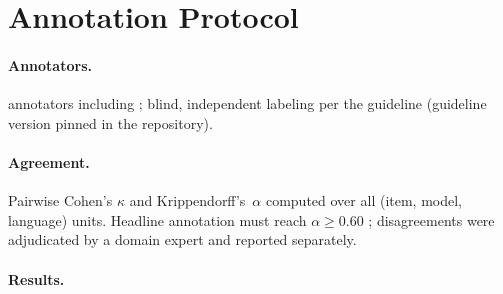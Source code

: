 \section{Annotation Protocol}
\label{sec:annotation}

\paragraph{Annotators.}  annotators including ; blind, independent labeling per the guideline
(guideline version pinned in the repository).

\paragraph{Agreement.} Pairwise Cohen's $\kappa$ and Krippendorff's~$\alpha$
computed over all (item, model, language) units. Headline annotation must
reach $\alpha \geq 0.60$ \citep{landis1977measurement}; disagreements were
adjudicated by a domain expert and reported separately.

\paragraph{Results.} 
